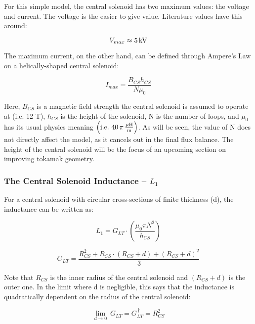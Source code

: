 For this simple model, the central solenoid has two maximum values: the voltage and current. The voltage is the easier to give value. Literature values have this around: \cite{arc}

\begin{equation}
	V_{max} \approx 5 \, \textnormal{kV}
\end{equation}

The maximum current, on the other hand, can be defined through Ampere's Law on a helically-shaped central solenoid: \cite{griffiths}

\begin{equation}
	I_{max} = \frac{B_{CS} h_{CS}}{N \mu_0}
\end{equation}

Here, $B_{CS}$ is a magnetic field strength the central solenoid is assumed to operate at (i.e. 12 T), $h_{CS}$ is the height of the solenoid, N is the number of loops, and $\mu_0$ has its usual physics meaning $\left( \textnormal{i.e.} \ 40 \, \pi \, \frac{ \mu \textnormal{H}}{\textnormal{m}} \right)$. As will be seen, the value of N does not directly affect the model, as it cancels out in the final flux balance. The height of the central solenoid will be the focus of an upcoming section on improving tokamak geometry.

\subsubsection{The Central Solenoid Inductance -- $L_1$}

For a central solenoid with circular cross-sections of finite thickness (d), the inductance can be written as: \cite{hartmann}

\begin{equation}
	L_1 = G_{LT} \cdot \left( \frac{\mu_0 \pi N^2}{h_{CS}} \right)
\end{equation}

\begin{equation}
	G_{LT} = \frac{R_{CS}^2 + R_{CS} \cdot ( R_{CS} + d ) + ( R_{CS} + d ) ^ 2 }{3}
\end{equation}

Note that $R_{CS}$ is the inner radius of the central solenoid and $( R_{CS} + d )$ is the outer one. In the limit where d is negligible, this says that the inductance is quadratically dependent on the radius of the central solenoid:

\begin{equation}
	\label{eq:glt_simple}
	\underset{d \to 0}{\lim} \ G_{LT} = G_{LT}^{\,\dagger} = R_{CS}^2
\end{equation}

